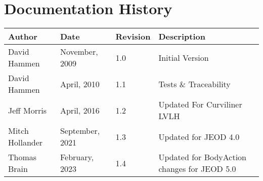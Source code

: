 
\section{Documentation History}
\begin{tabular}{||l|l|l|l|} \hline
{\bf Author } & {\bf Date} & {\bf Revision} & {\bf Description} \\ \hline \hline
 David Hammen & November, 2009 & 1.0 & Initial Version \\ \hline
 David Hammen & April, 2010 & 1.1 & Tests \& Traceability \\ \hline
 Jeff Morris & April, 2016 & 1.2 & Updated For Curviliner LVLH \\ \hline
 Mitch Hollander & September, 2021 & 1.3 & Updated for JEOD 4.0 \\ \hline
 Thomas Brain & February, 2023 & 1.4 & Updated for BodyAction changes for JEOD 5.0 \\ \hline
\end{tabular}

